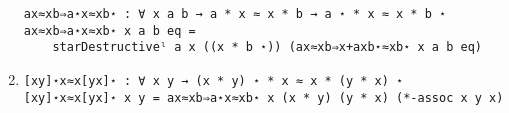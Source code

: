 \begin{enumerate}
\begin{Verbatim}
ax≈xb⇒a⋆x≈xb⋆ : ∀ x a b → a * x ≈ x * b → a ⋆ * x ≈ x * b ⋆
ax≈xb⇒a⋆x≈xb⋆ x a b eq = 
	starDestructiveˡ a x ((x * b ⋆)) (ax≈xb⇒x+axb⋆≈xb⋆ x a b eq)
\end{Verbatim}
\item
\begin{Verbatim}
[xy]⋆x≈x[yx]⋆ : ∀ x y → (x * y) ⋆ * x ≈ x * (y * x) ⋆
[xy]⋆x≈x[yx]⋆ x y = ax≈xb⇒a⋆x≈xb⋆ x (x * y) (y * x) (*-assoc x y x)
\end{Verbatim}
\end{enumerate}